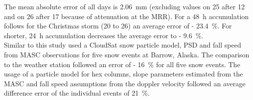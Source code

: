 The mean absolute error of all days is \SI{2.06}{\mm} (excluding values on \SI{25}{\dec} after \SI{12}{\UTC} and on \SI{26}{\dec} after \SI{17}{\UTC} because of attenuation at the MRR). For a \SI{48}{\hour} accumulation follows for the Christmas storm (\num{20} to \SI{26}{\dec}) an average error of \SI{- 23.4}{\percent}. For shorter, \SI{24}{\hour} accumulation decreases the average error to \SI{- 9.6}{\percent}.
\\
Similar to this study used \citet{cooper_variational_2017} a CloudSat snow particle model, PSD and fall speed from MASC observations for five snow events at Barrow, Alaska. The comparison to the weather station followed an error of \SI{- 16}{\percent} for all five snow events. The usage of a particle model for hex columns, slope parameters estimated from the MASC and fall speed assumptions from the doppler velocity followed an average difference error of the individual events of \SI{21}{\percent}. 
